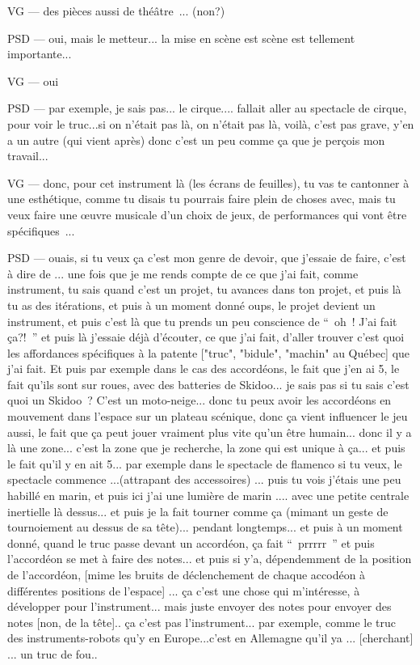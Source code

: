 VG — des pièces aussi de théâtre ... (non?) 

PSD — oui, mais le metteur... la mise en scène est scène est tellement importante...  

VG — oui 

PSD — par exemple, je sais pas... le cirque.... fallait aller au spectacle de cirque, pour voir le truc...si on n'était pas là, on n'était pas là, voilà, c'est pas grave, y'en a un autre (qui vient après) donc c'est un peu comme ça que je perçois mon travail...  

VG — donc, pour cet instrument là (les écrans de feuilles), tu vas te cantonner à une esthétique, comme tu disais tu pourrais faire plein de choses avec, mais tu veux faire une œuvre musicale d'un choix de jeux, de performances qui vont être spécifiques ... 

PSD — ouais, si tu veux ça c'est mon genre de devoir, que j'essaie de faire, c'est à dire de ... une fois que je me rends compte de ce que j'ai fait, comme instrument, tu sais quand c'est un projet, tu avances dans ton projet, et puis là tu as des itérations, et puis à un moment donné oups, le projet devient un instrument, et puis c'est là que tu prends un peu conscience de “ oh ! J'ai fait ça?! ” et puis là j'essaie déjà d'écouter, ce que j'ai fait, d'aller trouver c'est quoi les affordances spécifiques à la patente ["truc", "bidule", "machin" au Québec] que j'ai fait. Et puis par exemple dans le cas des accordéons, le fait que j'en ai 5, le fait qu'ils sont sur roues, avec des batteries de Skidoo... je sais pas si tu sais c'est quoi un Skidoo ? C'est un moto-neige... donc tu peux avoir les accordéons en mouvement dans l'espace sur un plateau scénique, donc ça vient influencer le jeu aussi, le fait que ça peut jouer vraiment plus vite qu'un être humain... donc il y a là une zone... c'est la zone que je recherche, la zone qui est unique à ça... et puis le fait qu'il y en ait 5... par exemple dans le spectacle de flamenco si tu veux, le spectacle commence ...(attrapant des accessoires) ... puis tu vois j'étais une peu habillé en marin, et puis ici j'ai une lumière de marin .... avec une petite centrale inertielle là dessus... et puis je la fait tourner comme ça (mimant un geste de tournoiement au dessus de sa tête)... pendant longtemps... et puis à un moment donné, quand le truc passe devant un accordéon, ça fait “ prrrrr ” et puis l'accordéon se met à faire des notes... et puis si y'a, dépendemment de la position de l'accordéon, [mime les bruits de déclenchement de chaque accodéon à différentes positions de l'espace] ... ça c'est une chose qui m'intéresse, à développer pour l'instrument... mais juste envoyer des notes pour envoyer des notes [non, de la tête].. ça c'est pas l'instrument... par exemple, comme le truc des instruments-robots qu'y en Europe...c'est en Allemagne qu'il ya  ... [cherchant] ... un truc de fou..  

